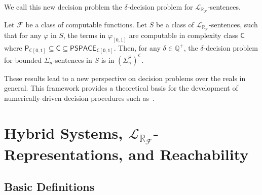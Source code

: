 \documentclass[envcountsect]{llncs}
\newcommand{\lrf}{\mathcal{L}_{\mathbb{R}_{\mathcal{F}}}}
\begin{document}
We call this new decision problem the $\delta$-decision problem for
$\lrf$-sentences. 
\begin{theorem}[Complexity]\label{compmain}
Let $\mathcal{F}$ be a class of computable functions. Let $S$ be a class of 
$\lrf$-sentences, such that for any $\varphi$ in $S$, the
terms in $\varphi_{[0,1]}$ are computable in complexity class $\mathsf{C}$ where
$\mathsf{P_{C[0,1]}\subseteq \mathsf{C}\subseteq \mathsf{PSPACE_{C[0,1]}}}$.
Then, for any $\delta\in \mathbb{Q}^+$, the $\delta$-decision problem for
bounded $\Sigma_n$-sentences in $S$ is in $\mathsf{(\Sigma_n^P)^C}$.
\end{theorem}

These results lead to a
new perspective on decision problems over the reals in general.
This framework provides a theoretical basis for the development of
numerically-driven decision procedures such as~\cite{}.



\section{Hybrid Systems, $\lrf$-Representations, and Reachability}




\subsection{Basic Definitions}
\end{document}
